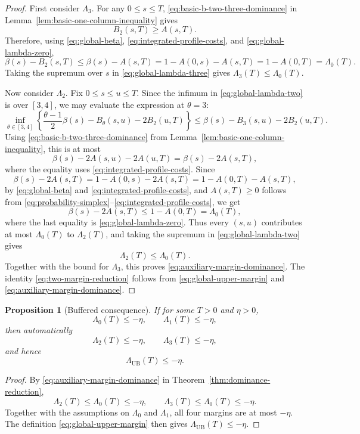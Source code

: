 \documentclass[11pt]{article}
\numberwithin{equation}{section}
\newtheorem{proposition}[proposition]{Proposition}
\newcommand{\1}{\mathbf 1}
\newcommand{\UB}{\mathrm{UB}}
\begin{document}
\begin{proof}
First consider $\Lambda_3$. For any $0\le s\le T$,
\eqref{eq:basic-b-two-three-dominance} in
Lemma~\ref{lem:basic-one-column-inequality} gives
\[
  B_2(s,T)\ge A(s,T).
\]
Therefore, using \eqref{eq:global-beta},
\eqref{eq:integrated-profile-costs}, and
\eqref{eq:global-lambda-zero},
\[
  \beta(s)-B_2(s,T)
  \le\beta(s)-A(s,T)
  =1-A(0,s)-A(s,T)
  =1-A(0,T)
  =\Lambda_0(T).
\]
Taking the supremum over $s$ in \eqref{eq:global-lambda-three} gives
$\Lambda_3(T)\le\Lambda_0(T)$.

Now consider $\Lambda_2$. Fix $0\le s\le u\le T$. Since the infimum in
\eqref{eq:global-lambda-two} is over $[3,4]$, we may evaluate the
expression at $\theta=3$:
\[
  \inf_{\theta\in[3,4]}
  \left\{\frac{\theta-1}{2}\beta(s)-B_\theta(s,u)-2B_2(u,T)\right\}
  \le \beta(s)-B_3(s,u)-2B_2(u,T).
\]
Using \eqref{eq:basic-b-two-three-dominance} from
Lemma~\ref{lem:basic-one-column-inequality}, this is at most
\[
  \beta(s)-2A(s,u)-2A(u,T)=\beta(s)-2A(s,T),
\]
where the equality uses \eqref{eq:integrated-profile-costs}. Since
\[
  \beta(s)-2A(s,T)
  =1-A(0,s)-2A(s,T)
  =1-A(0,T)-A(s,T),
\]
by \eqref{eq:global-beta} and \eqref{eq:integrated-profile-costs}, and
$A(s,T)\ge0$ follows from
\eqref{eq:probability-simplex}--\eqref{eq:integrated-profile-costs}, we get
\[
  \beta(s)-2A(s,T)\le1-A(0,T)=\Lambda_0(T),
\]
where the last equality is \eqref{eq:global-lambda-zero}. Thus every
$(s,u)$ contributes at most $\Lambda_0(T)$ to $\Lambda_2(T)$, and taking
the supremum in \eqref{eq:global-lambda-two} gives
\[
  \Lambda_2(T)\le\Lambda_0(T).
\]
Together with the bound for $\Lambda_3$, this proves
\eqref{eq:auxiliary-margin-dominance}. The identity
\eqref{eq:two-margin-reduction} follows from
\eqref{eq:global-upper-margin} and
\eqref{eq:auxiliary-margin-dominance}.
\end{proof}

\begin{proposition}[Buffered consequence]
\label{cor:buffered-consequence}
If for some $T>0$ and $\eta>0$,
\[
  \Lambda_0(T)\le-\eta,
  \qquad
  \Lambda_1(T)\le-\eta,
\]
then automatically
\[
  \Lambda_2(T)\le-\eta,
  \qquad
  \Lambda_3(T)\le-\eta,
\]
and hence
\[
  \Lambda_{\UB}(T)\le-\eta.
\]
\end{proposition}

\begin{proof}
By \eqref{eq:auxiliary-margin-dominance} in
Theorem~\ref{thm:dominance-reduction},
\[
  \Lambda_2(T)\le\Lambda_0(T)\le-\eta,
  \qquad
  \Lambda_3(T)\le\Lambda_0(T)\le-\eta.
\]
Together with the assumptions on $\Lambda_0$ and $\Lambda_1$, all four
margins are at most $-\eta$.  The definition
\eqref{eq:global-upper-margin} then gives
$\Lambda_{\UB}(T)\le-\eta$.
\end{proof}
\end{document}
